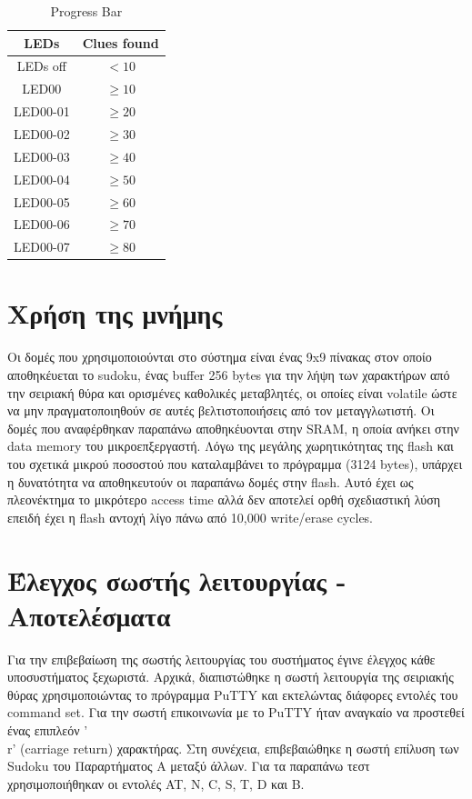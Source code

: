 \documentclass[a4paper,12pt]{article}
\begin{document}
\begin{table}[h!]
\centering
\begin{tabular}[c]{| c | c |}
\hline
LEDs & Clues found \\
\hline
LEDs off & $< 10$ \\
\hline
LED00 &  $\geq 10$ \\
\hline
LED00-01 & $\geq 20$ \\
\hline
LED00-02 & $\geq 30$ \\
\hline
LED00-03 & $\geq 40$ \\
\hline
LED00-04 & $\geq 50$ \\
\hline
LED00-05 & $\geq 60$ \\
\hline
LED00-06 & $\geq 70$ \\
\hline
LED00-07 & $\geq 80$ \\
\hline
\end{tabular}
\caption{Progress Bar}
\label{table:progress_bar}
\end{table}


\section{Χρήση της μνήμης}

Οι δομές που χρησιμοποιούνται στο σύστημα είναι ένας 9x9 πίνακας στον οποίο αποθηκέυεται το sudoku, ένας buffer 256 bytes για την λήψη των χαρακτήρων από την σειριακή θύρα και ορισμένες καθολικές μεταβλητές, οι οποίες είναι volatile ώστε να μην πραγματοποιηθούν σε αυτές βελτιστοποιήσεις από τον μεταγγλωτιστή. Οι δομές που αναφέρθηκαν παραπάνω αποθηκέυονται στην SRAM, η οποία ανήκει στην data memory του μικροεπξεργαστή. Λόγω της μεγάλης χωρητικότητας της flash και του σχετικά μικρού ποσοστού που καταλαμβάνει το πρόγραμμα (3124 bytes), υπάρχει η δυνατότητα να αποθηκευτούν οι παραπάνω δομές στην flash. Αυτό έχει ως πλεονέκτημα το μικρότερο access time αλλά δεν αποτελεί ορθή σχεδιαστική λύση επειδή έχει η flash αντοχή λίγο πάνω από 10,000 write/erase cycles. \\


\section{Έλεγχος σωστής λειτουργίας - Αποτελέσματα}

Για την επιβεβαίωση της σωστής λειτουργίας του συστήματος έγινε έλεγχος κάθε υποσυστήματος ξεχωριστά. Αρχικά, διαπιστώθηκε η σωστή λειτουργία της σειριακής θύρας χρησιμοποιώντας το πρόγραμμα PuTTY και εκτελώντας διάφορες εντολές του command set. Για την σωστή επικοινωνία με το PuTTY ήταν αναγκαίο να προστεθεί ένας επιπλεόν '\\r' (carriage return) χαρακτήρας. Στη συνέχεια, επιβεβαιώθηκε η σωστή επίλυση των Sudoku του Παραρτήματος Α μεταξύ άλλων. Για τα παραπάνω τεστ χρησιμοποιήθηκαν οι εντολές AT, N, C, S, T, D και B.\\
\end{document}
